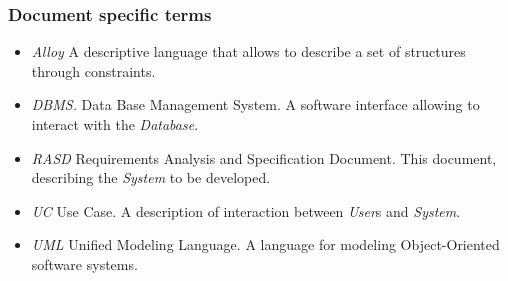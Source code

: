 \subsubsection{Document specific terms}
\begin{itemize}
	\item \emph{Alloy} 
	A descriptive language that allows to describe a set of structures through constraints.
	\item \emph{DBMS.}
	Data Base Management System. A software interface allowing to interact with the \emph{Database}.
	\item \emph{RASD}
	Requirements Analysis and Specification Document. This document, describing the \emph{System} to be developed.
	\item \emph{UC}
	Use Case. A description of interaction between \emph{User}s and \emph{System}.
	\item \emph{UML}
	Unified Modeling Language. A language for modeling Object-Oriented software systems.
\end{itemize}